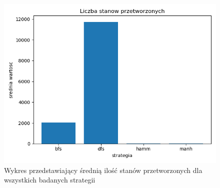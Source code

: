 \documentclass{classrep}
\begin{document}
{\begin{figure}
\includegraphics [scale=0.5]{przetworzone}
\caption{Wykres przedstawiający średnią ilość stanów przetworzonych dla wszystkich badanych strategii}
\end{figure}
}
\newpage
\end{document}
